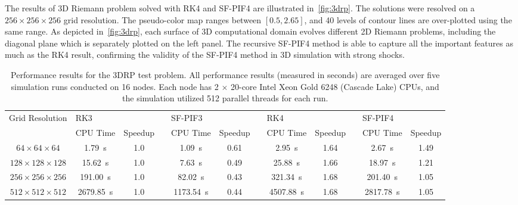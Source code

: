 The results of 3D Riemann problem solved with RK4 and SF-PIF4 are
illustrated in~\cref{fig:3drp}. The solutions were resolved on a
\( 256 \times 256 \times 256 \) grid resolution.
The pseudo-color map ranges between \( [0.5, 2.65] \),
and 40 levels of contour lines are over-plotted using the same range.
As depicted in~\cref{fig:3drp}, each surface of 3D computational domain
evolves different 2D Riemann problems, including the diagonal plane which is
separately plotted on the left panel.
The recursive SF-PIF4 method is able to capture all the important features as much as the RK4 result,
confirming the validity of the SF-PIF4 method in 3D simulation with strong shocks.

\begin{table}
    \centering
    \caption{Performance results for the 3DRP test problem.
        All performance results (measured in seconds) are averaged over
        five simulation runs conducted on 16 nodes.%
        Each node has 2 \( \times \) 20-core Intel Xeon Gold 6248 (Cascade Lake) CPUs,
        and the simulation utilized 512 parallel threads for each run.
    }\label{table:3drp}
    \begin{adjustbox}{width=\textwidth}
        \begin{tabular}{@{}cccccccccccc@{}}
            \toprule
            \multirow{2}{*}{Grid Resolution} & \multicolumn{2}{l}{RK3} &  & \multicolumn{2}{l}{SF-PIF3}
                    & & \multicolumn{2}{l}{RK4} & & \multicolumn{2}{l}{SF-PIF4} \\
            \cmidrule(lr){2-3} \cmidrule(l){5-6} \cmidrule(l){8-9} \cmidrule(l){11-12}
            & CPU Time & Speedup &  & CPU Time & Speedup & & CPU Time & Speedup & & CPU Time & Speedup\\
            \midrule
            \( 64 \times 64 \times 64 \)   & \SI{1.79}{\second} & 1.0 &  & \SI{1.09}{\second} & 0.61 & &
                \SI{2.95}{\second} & 1.64 &  & \SI{2.67}{\second} & 1.49 \\
            \( 128 \times 128 \times 128 \) & \SI{15.62}{\second} & 1.0 &  & \SI{7.63}{\second} & 0.49 & &
                \SI{25.88}{\second} & 1.66 &  & \SI{18.97}{\second} & 1.21 \\
            \( 256 \times 256 \times 256 \) & \SI{191.00}{\second}   & 1.0 &  & \SI{82.02}{\second} & 0.43 & &
                \SI{321.34}{\second} & 1.68 &  & \SI{201.40}{\second} & 1.05 \\
            \( 512 \times 512 \times 512 \) & \SI{2679.85}{\second}  & 1.0 &  & \SI{1173.54}{\second} & 0.44 & &
                \SI{4507.88}{\second} & 1.68 &  & \SI{2817.78}{\second} & 1.05 \\
        \end{tabular}
    \end{adjustbox}
\end{table}

